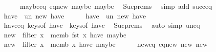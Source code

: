 \begin{isabellebody}
\ \ \ \ \isamarkupfalse%
\ maybe{\isacharunderscore}{\kern0pt}eq{\isacharcolon}{\kern0pt}\ {\isachardoublequoteopen}eq{\isacharunderscore}{\kern0pt}new\ {\isacharquery}{\kern0pt}maybe{}\ {\isacharquery}{\kern0pt}maybe{}{\isachardoublequoteclose}\ \isamarkupfalse%
\ Suc{\isachardot}{\kern0pt}prems{\isacharparenleft}{\kern0pt}{}{\isacharparenright}{\kern0pt}\ \isamarkupfalse%
\ {\isacharparenleft}{\kern0pt}simp\ add{\isacharcolon}{\kern0pt}\ succ{\isacharunderscore}{\kern0pt}eq{\isacharparenright}{\kern0pt}\isanewline
\ \ \ \ \isamarkupfalse%
\ {\isacharquery}{\kern0pt}have{}\ {\isacharequal}{\kern0pt}\ {\isachardoublequoteopen}un\ new\ have{\isachardoublequoteclose}\isanewline
\ \ \ \ \isamarkupfalse%
\ {\isacharquery}{\kern0pt}have{}\ {\isacharequal}{\kern0pt}\ {\isachardoublequoteopen}un{\isacharprime}{\kern0pt}\ new{\isacharprime}{\kern0pt}\ have{\isacharprime}{\kern0pt}{\isachardoublequoteclose}\isanewline
\ \ \ \ \isamarkupfalse%
\ have{\isacharprime}{\kern0pt}{\isacharunderscore}{\kern0pt}eq{\isacharcolon}{\kern0pt}\ {\isachardoublequoteopen}keys{\isacharunderscore}{\kern0pt}of\ {\isacharquery}{\kern0pt}have{}\ {\isacharequal}{\kern0pt}\ keys{\isacharunderscore}{\kern0pt}of\ {\isacharquery}{\kern0pt}have{}{\isachardoublequoteclose}\ \isamarkupfalse%
\ Suc{\isachardot}{\kern0pt}prems\ \isamarkupfalse%
\ {\isacharparenleft}{\kern0pt}auto\ simp{\isacharcolon}{\kern0pt}\ un{\isacharunderscore}{\kern0pt}eq{\isacharparenright}{\kern0pt}\isanewline
\ \ \ \ \isamarkupfalse%
\ {\isacharquery}{\kern0pt}new{}\ {\isacharequal}{\kern0pt}\ {\isachardoublequoteopen}filter\ {\isacharparenleft}{\kern0pt}{\isasymlambda}x{\isachardot}{\kern0pt}\ {\isasymnot}\ memb\ {\isacharparenleft}{\kern0pt}fst\ x{\isacharparenright}{\kern0pt}\ {\isacharquery}{\kern0pt}have{}{\isacharparenright}{\kern0pt}\ {\isacharquery}{\kern0pt}maybe{}{\isachardoublequoteclose}\isanewline
\ \ \ \ \isamarkupfalse%
\ {\isacharquery}{\kern0pt}new{}\ {\isacharequal}{\kern0pt}\ {\isachardoublequoteopen}filter\ {\isacharparenleft}{\kern0pt}{\isasymlambda}x{\isachardot}{\kern0pt}\ {\isasymnot}\ memb\ x\ {\isacharquery}{\kern0pt}have{}{\isacharparenright}{\kern0pt}\ {\isacharquery}{\kern0pt}maybe{}{\isachardoublequoteclose}\isanewline
\ \ \ \ \isamarkupfalse%
\ new{\isacharprime}{\kern0pt}{\isacharunderscore}{\kern0pt}eq{\isacharcolon}{\kern0pt}\ {\isachardoublequoteopen}eq{\isacharunderscore}{\kern0pt}new\ {\isacharquery}{\kern0pt}new{}\ {\isacharquery}{\kern0pt}new{}{\isachardoublequoteclose}\ \isamarkupfalse%

\end{isabellebody}
